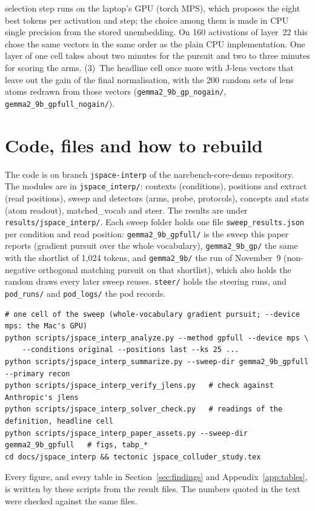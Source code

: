 \documentclass[11pt]{article}
\newcounter{finding}
\begin{document}
\begin{itemize}
selection step runs on the laptop's GPU (torch MPS), which proposes the eight best tokens per activation and step; the
choice among them is made in CPU single precision from the stored unembedding. On 160 activations of layer~22 this chose
the same vectors in the same order as the plain CPU implementation. One layer of one cell takes about two minutes for the
pursuit and two to three minutes for scoring the arms. (3)~The headline cell once more with J-lens vectors that leave out
the gain of the final normalisation, with the 200 random sets of lens atoms redrawn from those vectors
(\texttt{gemma2\_9b\_gp\_nogain/}, \texttt{gemma2\_9b\_gpfull\_nogain/}).
\end{itemize}

\section{Code, files and how to rebuild}\label{app:files}
The code is on branch \texttt{jspace-interp} of the narcbench-core-demo repository. The modules are in
\texttt{jspace\_interp/}: contexts (conditions), positions and extract (read positions), sweep and detectors (arms, probe,
protocols), concepts and stats (atom readout), matched\_vocab and steer. The results are under
\texttt{results/jspace\_interp/}. Each sweep folder holds one file \texttt{sweep\_results.json} per condition and read
position: \texttt{gemma2\_9b\_gpfull/} is the sweep this paper reports (gradient pursuit over the whole vocabulary),
\texttt{gemma2\_9b\_gp/} the same with the shortlist of 1{,}024 tokens, and \texttt{gemma2\_9b/} the run of November~9
(non-negative orthogonal matching pursuit on that shortlist), which also holds the random draws every later sweep reuses.
\texttt{steer/} holds the steering runs, and \texttt{pod\_runs/} and \texttt{pod\_logs/} the pod records.
{\footnotesize
\begin{verbatim}
# one cell of the sweep (whole-vocabulary gradient pursuit; --device mps: the Mac's GPU)
python scripts/jspace_interp_analyze.py --method gpfull --device mps \
    --conditions original --positions last --ks 25 ...
python scripts/jspace_interp_summarize.py --sweep-dir gemma2_9b_gpfull --primary recon
python scripts/jspace_interp_verify_jlens.py   # check against Anthropic's jlens
python scripts/jspace_interp_solver_check.py   # readings of the definition, headline cell
python scripts/jspace_interp_paper_assets.py --sweep-dir gemma2_9b_gpfull   # figs, tabp_*
cd docs/jspace_interp && tectonic jspace_colluder_study.tex
\end{verbatim}
}
Every figure, and every table in Section~\ref{sec:findings} and Appendix~\ref{app:tables}, is written by these scripts
from the result files. The numbers quoted in the text were checked against the same files.
\end{document}
